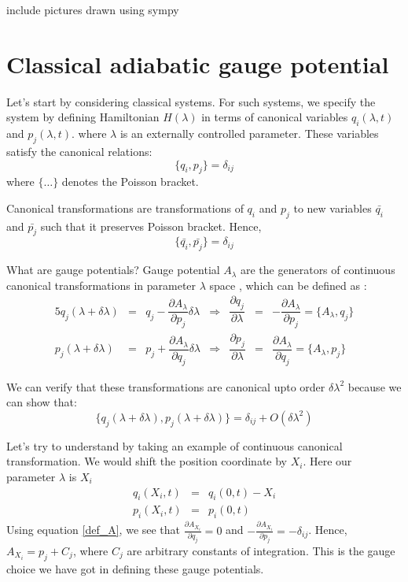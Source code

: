 \documentclass[11pt,a4paper]{article}
\begin{document}
include pictures drawn using sympy


\section{Classical adiabatic gauge potential}
Let's start by considering classical systems. For such systems, we specify the system by defining Hamiltonian $H (\lambda)$ in terms of canonical variables $q_i (\lambda,t)$ and $p_j (\lambda,t)$. where $\lambda$ is an externally controlled parameter. These variables satisfy the canonical relations:
\begin{equation}
\{q_i,p_j \}=\delta_{ij} 
\end{equation}
where $\{\ldots \}$ denotes the Poisson bracket.

Canonical transformations are transformations of $q_i$ and $p_j$ to new variables $\bar{q_i}$ and $\bar{p_j}$ such that it preserves Poisson bracket. Hence, 
\begin{equation}
\{\bar{q_i},\bar{p_j} \}=\delta_{ij} 
\end{equation}

What are gauge potentials? Gauge potential $A_{\lambda}$  are the generators of continuous canonical transformations in parameter $\lambda$ space , which can be defined as :
\begin{alignat}{5}
q_j(\lambda + \delta \lambda) & =& q_j - \dfrac{\partial A_{\lambda}}{\partial p_j} \delta \lambda &\Rightarrow & \dfrac{\partial q_j}{\partial \lambda} &=& -\dfrac{\partial A_{\lambda}}{\partial p_j} = \{A_{\lambda},q_j \} \\
p_j(\lambda + \delta \lambda) & =& p_j + \dfrac{\partial A_{\lambda}}{\partial q_j} \delta \lambda & \Rightarrow & \dfrac{\partial p_j}{\partial \lambda} &=& \dfrac{\partial A_{\lambda}}{\partial q_j}=\{ A_{\lambda},p_j \}
\label{def_A}
\end{alignat}

We can verify that these transformations are canonical upto order $\delta \lambda ^2$ because we can show that:
\begin{equation}
\{q_j(\lambda + \delta \lambda), p_j(\lambda + \delta \lambda)\} = \delta_{ij} + O(\delta \lambda ^2)
\end{equation}

Let's try to understand by taking an example of continuous canonical transformation. We would shift the position coordinate by $X_i$. Here our parameter $\lambda$ is $X_i$
\begin{eqnarray}
 q_i(X_i,t) &=& q_i(0,t) - X_i \\
p_i(X_i,t)&=& p_i(0,t)
\end{eqnarray}
Using equation \ref{def_A}, we see that $\frac{\partial A_{X_i}}{\partial q_j}=0$ and $-\frac{\partial A_{X_i}}{\partial p_j}=-\delta_{ij}$. Hence, $A_{X_i}=p_j + C_j$, where $C_j$ are arbitrary constants of integration. This is the gauge choice we have got in defining these gauge potentials. 
\end{document}

